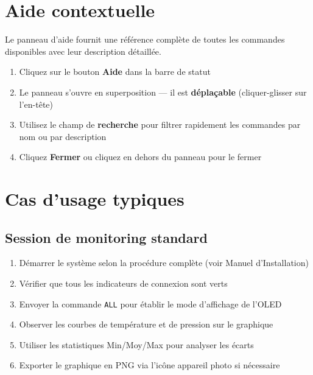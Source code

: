 \documentclass[a4paper,12pt]{article}
\newcommand{\cmd}[1]{\texttt{\colorbox{CodeBg}{\textcolor{PrimaryBlue}{#1}}}}
\begin{document}
\section{Aide contextuelle}

Le panneau d'aide fournit une r\'ef\'erence compl\`ete de toutes les commandes disponibles
avec leur description d\'etaill\'ee.

\begin{enumerate}[noitemsep, label=\arabic*.]
  \item Cliquez sur le bouton \textbf{Aide} dans la barre de statut
  \item Le panneau s'ouvre en superposition --- il est \textbf{d\'epla\c{c}able} (cliquer-glisser sur l'en-t\^ete)
  \item Utilisez le champ de \textbf{recherche} pour filtrer rapidement les commandes
        par nom ou par description
  \item Cliquez \textbf{Fermer} ou cliquez en dehors du panneau pour le fermer
\end{enumerate}

\section{Cas d'usage typiques}

\subsection{Session de monitoring standard}

\begin{enumerate}[noitemsep, label=\arabic*.]
  \item D\'emarrer le syst\`eme selon la proc\'edure compl\`ete (voir Manuel d'Installation)
  \item V\'erifier que tous les indicateurs de connexion sont verts
  \item Envoyer la commande \cmd{ALL} pour \'etablir le mode d'affichage de l'OLED
  \item Observer les courbes de temp\'erature et de pression sur le graphique
  \item Utiliser les statistiques Min/Moy/Max pour analyser les \'ecarts
  \item Exporter le graphique en PNG via l'ic\^one appareil photo si n\'ecessaire
\end{enumerate}
\end{document}
